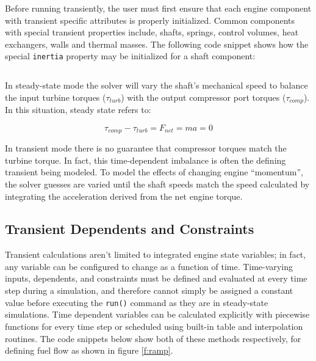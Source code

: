 \documentclass[heading.tex]{subfiles}
\begin{document}
Before running transiently, the user must first ensure that each engine component with transient
specific attributes is properly initialized. Common components with special transient properties
include, shafts, springs, control volumes, heat exchangers, walls and thermal masses.
The following code snippet shows how the special \texttt{inertia} property may be initialized
for a shaft component:

 \begin{adjustwidth}{-1cm}{-1cm}
 \inputminted[]{c++}{code/shaft.mdl}
 \end{adjustwidth} 

In steady-state mode the solver will vary the shaft's mechanical speed to
balance the input turbine torques ($\tau_{turb}$)
with the output compressor port torques ($\tau_{comp}$).
In this situation, steady state refers to:

\begin{equation}
\tau_{comp} - \tau_{turb} = F_{net} = ma = 0
\end{equation}

In transient mode there is no guarantee that compressor torques match the
turbine torque. In fact, this time-dependent imbalance is often
the defining transient being modeled.
To model the effects of changing engine ``momentum'',
the solver guesses are varied until the shaft speeds 
match the speed calculated by integrating
the acceleration derived from the net engine torque.

\subsection{Transient Dependents and Constraints}

Transient calculations aren't limited to integrated engine state variables;
in fact, any variable can be configured to change as a function of time.
Time-varying inputs, dependents, and constraints must be defined and evaluated at every time
step during a simulation, and therefore cannot simply be
assigned a constant value before executing the \texttt{run()} command as they are in steady-state simulations.
Time dependent variables can be calculated explicitly with
piecewise functions for every time step or scheduled using built-in table and interpolation routines.
The code snippets below show both of these methods respectively, for defining fuel flow as shown in figure \ref{f:ramp}.
\end{document}
